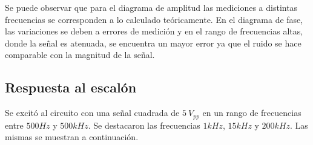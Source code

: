Se puede observar que para el diagrama de amplitud las mediciones a distintas frecuencias se corresponden a lo calculado teóricamente. En el diagrama de fase, las variaciones se deben a errores de medición y en el rango de frecuencias altas, donde la señal es atenuada, se encuentra un mayor error ya que el ruido se hace comparable con la magnitud de la señal.

\subsection{Respuesta al escalón}

Se excitó al circuito con una señal cuadrada de $5~V_{pp}$ en un rango de frecuencias entre $500Hz$ y $500kHz$. Se destacaron las frecuencias $1kHz$, $15kHz$ y $200kHz$. Las mismas se muestran a continuación.


